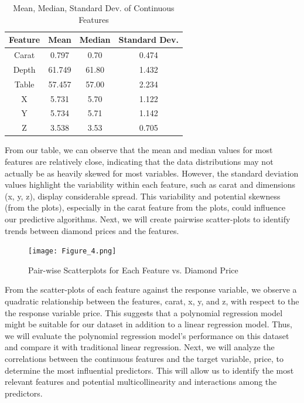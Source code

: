 \documentclass[conference]{IEEEtran}
\begin{document}
\begin{table}[H]
    \centering
    \caption{Mean, Median, Standard Dev. of Continuous Features}
    \label{tab:example_table}
    \begin{tabular}{|c|c|c|c|}
        \hline
        Feature & Mean & Median & Standard Dev. \\
        \hline
        Carat & 0.797 & 0.70 & 0.474 \\
        \hline
        Depth & 61.749 & 61.80  & 1.432 \\
        \hline
        Table & 57.457 & 57.00 & 2.234 \\
        \hline
        X & 5.731 & 5.70 & 1.122 \\
        \hline
        Y & 5.734 & 5.71 & 1.142 \\
        \hline
        Z & 3.538 & 3.53 & 0.705 \\
        \hline
    \end{tabular}
\end{table}

From our table, we can observe that the mean and median values for most features are relatively close, indicating that the data distributions may not actually be as heavily skewed for most variables. However, the standard deviation values highlight the variability within each feature, such as carat and dimensions (x, y, z), display considerable spread. This variability and potential skewness (from the plots), especially in the carat feature from the plots, could influence our predictive algorithms. Next, we will create pairwise scatter-plots to identify trends between diamond prices and the features.

\begin{figure}[H]
    \centering
    \texttt{[image: Figure\_4.png]} %
    \caption{Pair-wise Scatterplots for Each Feature vs. Diamond Price}
    \label{fig:scatter}
\end{figure}

From the scatter-plots of each feature against the response variable, we observe a quadratic relationship between the features, carat, x, y, and z, with respect to the the response variable price. This suggests that a polynomial regression model might be suitable for our dataset in addition to a linear regression model. Thus, we will evaluate the polynomial regression model's performance on this dataset and compare it with traditional linear regression. Next, we will analyze the correlations between the continuous features and the target variable, price, to determine the most influential predictors. This will allow us to identify the most relevant features and potential multicollinearity and interactions among the predictors.
\end{document}

